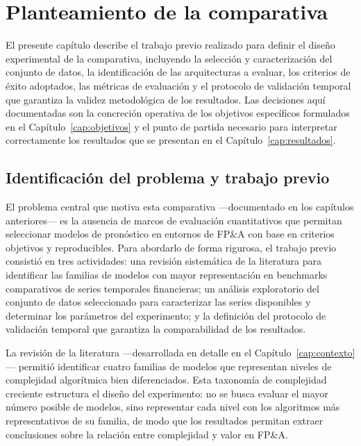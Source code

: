 \chapter{Planteamiento de la comparativa}
\label{cap:planteamiento}

El presente capítulo describe el trabajo previo realizado para definir el diseño experimental de la comparativa, incluyendo la selección y caracterización del conjunto de datos, la identificación de las arquitecturas a evaluar, los criterios de éxito adoptados, las métricas de evaluación y el protocolo de validación temporal que garantiza la validez metodológica de los resultados. Las decisiones aquí documentadas son la concreción operativa de los objetivos específicos formulados en el Capítulo~\ref{cap:objetivos} y el punto de partida necesario para interpretar correctamente los resultados que se presentan en el Capítulo~\ref{cap:resultados}.

\section{Identificación del problema y trabajo previo}
\label{sec:trabajo_previo}

El problema central que motiva esta comparativa ---documentado en los capítulos anteriores--- es la ausencia de marcos de evaluación cuantitativos que permitan seleccionar modelos de pronóstico en entornos de FP\&A con base en criterios objetivos y reproducibles. Para abordarlo de forma rigurosa, el trabajo previo consistió en tres actividades: una revisión sistemática de la literatura para identificar las familias de modelos con mayor representación en benchmarks comparativos de series temporales financieras; un análisis exploratorio del conjunto de datos seleccionado para caracterizar las series disponibles y determinar los parámetros del experimento; y la definición del protocolo de validación temporal que garantiza la comparabilidad de los resultados.

La revisión de la literatura ---desarrollada en detalle en el Capítulo~\ref{cap:contexto}--- permitió identificar cuatro familias de modelos que representan niveles de complejidad algorítmica bien diferenciados. Esta taxonomía de complejidad creciente estructura el diseño del experimento: no se busca evaluar el mayor número posible de modelos, sino representar cada nivel con los algoritmos más representativos de su familia, de modo que los resultados permitan extraer conclusiones sobre la relación entre complejidad y valor en FP\&A.

